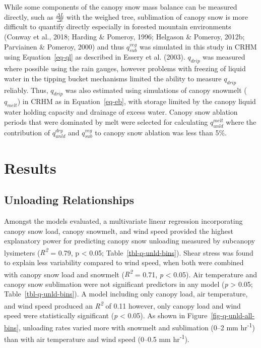\documentclass[
  letterpaper,
]{tex/uofsthesis-cs}
\begin{document}
While some components of the canopy snow mass balance can be measured
directly, such as \(\frac{\Delta L}{\Delta t}\) with the weighed tree,
sublimation of canopy snow is more difficult to quantify directly
especially in forested mountain environments (Conway et al., 2018;
Harding \& Pomeroy, 1996; Helgason \& Pomeroy, 2012b; Parviainen \&
Pomeroy, 2000) and thus \(q_{sub}^{veg}\) was simulated in this study in
CRHM using Equation~\ref{eq-ql} as described in Essery et al. (2003).
\(q_{drip}\) was measured where possible using the rain gauges, however
problems with freezing of liquid water in the tipping bucket mechanisms
limited the ability to measure \(q_{drip}\) reliably. Thus, \(q_{drip}\)
was also estimated using simulations of canopy snowmelt (\(q_{melt}\))
in CRHM as in Equation~\ref{eq-eb}, with storage limited by the canopy
liquid water holding capacity and drainage of excess water. Canopy snow
ablation periods that were dominated by melt were selected for
calculating \(q_{unld}^{melt}\) where the contribution of
\(q_{unld}^{dry}\) and \(q_{sub}^{veg}\) to canopy snow ablation was
less than 5\%.

\section{Results}\label{results-1}

\subsection{Unloading Relationships}\label{sec-unld-rel}

Amongst the models evaluated, a multivariate linear regression
incorporating canopy snow load, canopy snowmelt, and wind speed provided
the highest explanatory power for predicting canopy snow unloading
measured by subcanopy lysimeters (\emph{R\textsuperscript{2}} = 0.79, p
\textless{} 0.05; Table~\ref{tbl-q-unld-bins}). Shear stress was found
to explain less variability compared to wind speed, when both were
combined with canopy snow load and snowmelt (\emph{R\textsuperscript{2}}
= 0.71, \emph{p} \textless{} 0.05). Air temperature and canopy snow
sublimation were not significant predictors in any model (\emph{p}
\textgreater{} 0.05; Table~\ref{tbl-q-unld-bins}). A model including
only canopy load, air temperature, and wind speed produced an
\emph{R\textsuperscript{2}} of 0.11 however, only canopy load and wind
speed were statistically significant (\emph{p} \textless{} 0.05). As
shown in Figure~\ref{fig-q-unld-all-bins}, unloading rates varied more
with snowmelt and sublimation (0--2 mm hr\textsuperscript{-1}) than with
air temperature and wind speed (0--0.5 mm hr\textsuperscript{-1}).
\end{document}
